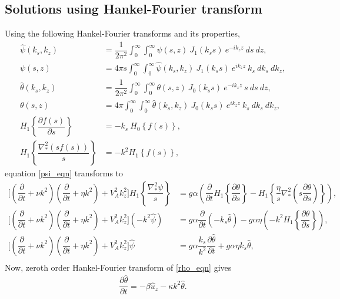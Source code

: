 \documentclass[12pt,psfig]{article}
\begin{document}
\subsection{Solutions using Hankel-Fourier transform}
Using the following Hankel-Fourier transforms and its properties,
\begin{align*}
\hat{\psi}(k_s,k_z)&=\dfrac{1}{2\pi^2}\int_{0}^{\infty}\int_{0}^{\infty}\psi(s,z) \ J_1(k_s s) \ e^{-ik_z z}\ ds \ dz, \\
{\psi}(s,z)&=4\pi s \int_{0}^{\infty}\int_{0}^{\infty}\hat{\psi}(k_s,k_z) \ J_1(k_s s) \ e^{ik_z z}\ k_s \ dk_s \ dk_z,\\
\hat{\theta}(k_s,k_z)&=\dfrac{1}{2\pi^2}\int_{0}^{\infty}\int_{0}^{\infty}\theta(s,z) \ J_0(k_s s) \ e^{-ik_z z} \ s \ ds \ dz, \\
{\theta}(s,z)&=4\pi  \int_{0}^{\infty}\int_{0}^{\infty}\hat{\theta}(k_s,k_z) \ J_0(k_s s) \ e^{ik_z z}\ k_s \ dk_s \ dk_z,\\
H_1\left\{\dfrac{\partial f(s)}{\partial s}\right\}&=-k_s \ H_0\left\{f(s)\right\},\\
H_1\left\{\dfrac{\nabla^2_* (s f(s))}{s}\right\}&=-k^2H_1\left\{f(s)\right\},
\end{align*}
equation \eqref{psi_eqn} transforms to
\begin{align*}
\Biggl[\left(\dfrac{\partial }{\partial t}+\nu k^2\right)\left(\dfrac{\partial }{\partial t}+\eta k^2\right)+V_A^2k_z^2\Biggr]H_1\left\{\dfrac{\nabla^2_*\psi}{s}\right\}&=g\alpha\left(\dfrac{\partial }{\partial t}H_1\left\{\dfrac{\partial \theta}{\partial s}\right\}-H_1\left\{\dfrac{\eta}{s}\nabla_*^2\left(s\dfrac{\partial \theta}{\partial s}\right)\right\}\right),\\
\Biggl[\left(\dfrac{\partial }{\partial t}+\nu k^2\right)\left(\dfrac{\partial }{\partial t}+\eta k^2\right)+V_A^2k_z^2\Biggr](-k^2\hat{\psi})&=g\alpha\dfrac{\partial}{\partial t}\left(-k_s\hat{\theta}\right)-g\alpha \eta\left(-k^2H_1\left\{\dfrac{\partial \theta}{\partial s}\right\}\right),\\
\Biggl[\left(\dfrac{\partial }{\partial t}+\nu k^2\right)\left(\dfrac{\partial }{\partial t}+\eta k^2\right)+V_A^2k_z^2\Biggr]\hat{\psi}&=g\alpha\dfrac{ k_s}{k^2}\dfrac{\partial \hat{\theta}}{\partial t}+g\alpha\eta k_s\hat{\theta},\\
\end{align*}
Now, zeroth order Hankel-Fourier transform of \eqref{rho_eqn} gives
\begin{align}
\dfrac{\partial\hat{\theta}}{\partial t}=-\beta\hat{u}_z-\kappa k^2 \hat{\theta}.\label{drhohat_dt}
\end{align}
\end{document}
